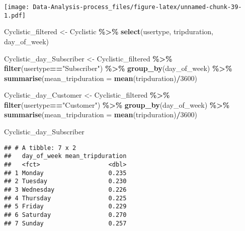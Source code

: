 \documentclass[
]{article}
\newenvironment{Shaded}{\begin{snugshade}}{\end{snugshade}}
\newcommand{\AttributeTok}[1]{\textcolor[rgb]{0.13,0.29,0.53}{#1}}
\newcommand{\DecValTok}[1]{\textcolor[rgb]{0.00,0.00,0.81}{#1}}
\newcommand{\FunctionTok}[1]{\textcolor[rgb]{0.13,0.29,0.53}{\textbf{#1}}}
\newcommand{\NormalTok}[1]{#1}
\newcommand{\OtherTok}[1]{\textcolor[rgb]{0.56,0.35,0.01}{#1}}
\newcommand{\SpecialCharTok}[1]{\textcolor[rgb]{0.81,0.36,0.00}{\textbf{#1}}}
\newcommand{\StringTok}[1]{\textcolor[rgb]{0.31,0.60,0.02}{#1}}
\begin{document}
\texttt{[image: Data-Analysis-process\_files/figure-latex/unnamed-chunk-39-1.pdf]}

\begin{Shaded}
\begin{Highlighting}[]
\NormalTok{Cyclistic\_filtered }\OtherTok{\textless{}{-}}\NormalTok{ Cyclistic }\SpecialCharTok{\%\textgreater{}\%}
  \FunctionTok{select}\NormalTok{(usertype, tripduration, day\_of\_week)}
\end{Highlighting}
\end{Shaded}

\begin{Shaded}
\begin{Highlighting}[]
\NormalTok{Cyclistic\_day\_Subscriber }\OtherTok{\textless{}{-}}\NormalTok{ Cyclistic\_filtered }\SpecialCharTok{\%\textgreater{}\%}
  \FunctionTok{filter}\NormalTok{(usertype}\SpecialCharTok{==}\StringTok{"Subscriber"}\NormalTok{) }\SpecialCharTok{\%\textgreater{}\%}
  \FunctionTok{group\_by}\NormalTok{(day\_of\_week) }\SpecialCharTok{\%\textgreater{}\%}
  \FunctionTok{summarise}\NormalTok{(}\AttributeTok{mean\_tripduration =} \FunctionTok{mean}\NormalTok{(tripduration)}\SpecialCharTok{/}\DecValTok{3600}\NormalTok{)}
\end{Highlighting}
\end{Shaded}

\begin{Shaded}
\begin{Highlighting}[]
\NormalTok{Cyclistic\_day\_Customer }\OtherTok{\textless{}{-}}\NormalTok{ Cyclistic\_filtered }\SpecialCharTok{\%\textgreater{}\%}
  \FunctionTok{filter}\NormalTok{(usertype}\SpecialCharTok{==}\StringTok{"Customer"}\NormalTok{) }\SpecialCharTok{\%\textgreater{}\%}
  \FunctionTok{group\_by}\NormalTok{(day\_of\_week) }\SpecialCharTok{\%\textgreater{}\%}
  \FunctionTok{summarise}\NormalTok{(}\AttributeTok{mean\_tripduration =} \FunctionTok{mean}\NormalTok{(tripduration)}\SpecialCharTok{/}\DecValTok{3600}\NormalTok{)}
\end{Highlighting}
\end{Shaded}

\begin{Shaded}
\begin{Highlighting}[]
\NormalTok{Cyclistic\_day\_Subscriber}
\end{Highlighting}
\end{Shaded}

\begin{verbatim}
## # A tibble: 7 x 2
##   day_of_week mean_tripduration
##   <fct>                   <dbl>
## 1 Monday                  0.235
## 2 Tuesday                 0.230
## 3 Wednesday               0.226
## 4 Thursday                0.225
## 5 Friday                  0.229
## 6 Saturday                0.270
## 7 Sunday                  0.257
\end{verbatim}
\end{document}

